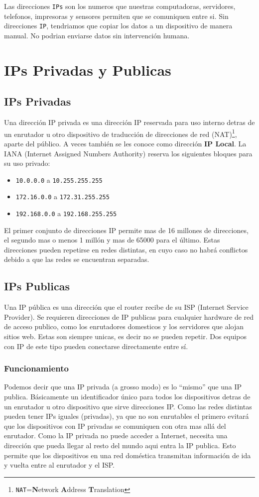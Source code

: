 Las direcciones \texttt{IPs} son los numeros que nuestras computadoras, servidores, telefonos, impresoras y sensores permiten que se comuniquen entre si. Sin direcciones \texttt{IP}, tendriamos que copiar los datos a un dispositivo de manera manual. No podrian enviarse datos sin intervención humana.
\section*{IPs Privadas y Publicas} 
\subsection*{IPs Privadas}
Una dirección IP privada es una dirección IP reservada para uso interno detras de un enrutador u otro dispositivo de traducción de direcciones de red (NAT)\footnote{\texttt{NAT}=\textbf{N}etwork \textbf{A}ddress \textbf{T}ranslation}, aparte del público. A veces también se les conoce como dirección \textbf{IP Local}. La IANA (Internet Assigned Numbers Authority) reserva los siguientes bloques para su uso privado:
\begin{itemize}
\item \texttt{10.0.0.0} a \texttt{10.255.255.255}
\item \texttt{172.16.0.0} a \texttt{172.31.255.255}
\item \texttt{192.168.0.0} a \texttt{192.168.255.255}
\end{itemize}
El primer conjunto de direcciones IP permite mas de 16 millones de direcciones, el segundo mas o menos 1 millón y mas de 65000 para el último. Estas direcciones pueden repetirse en redes distintas, en cuyo caso no habrá conflictos debido a que las redes se encuentran separadas.
\subsection*{IPs Publicas}
Una IP pública es una dirección que el router recibe de su ISP (Internet Service Provider). Se requieren direcciones de IP publicas para cualquier hardware de red de acceso publico, como los enrutadores domesticos y los servidores que alojan sitios web. Estas son siempre unicas, es decir no se pueden repetir. Dos equipos con IP de este tipo pueden conectarse directamente entre sí.

\subsubsection*{Funcionamiento}
Podemos decir que una IP privada (a grosso modo) es lo ``mismo'' que una IP publica. Básicamente un identificador único para todos los dispositivos detras de un enrutador u otro dispositivo que sirve direcciones IP. Como las redes distintas pueden tener IPs iguales (privadas), ya que no son enrutables el primero evitará que los dispositivos con IP privadas se comuniquen con otra mas allá del enrutador. Como la IP privada no puede acceder a Internet, necesita una dirección que pueda llegar al resto del mundo aqui entra la IP publica.  Esto permite que los dispositivos en una red doméstica transmitan información de ida y vuelta entre al enrutador y el ISP.


